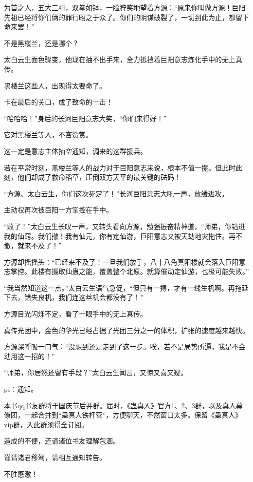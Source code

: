 \begin{this_body}
为首之人，五大三粗，双拳如钵，一脸狞笑地望着方源：“原来你叫做方源！巨阳先祖已经将你们俩的罪行昭之于众了。你们的阴谋破裂了，一切到此为止，都留下命来罢！”

不是黑楼兰，还是哪个？

太白云生面色骤变，他现在抽不出手来，全力抵挡着巨阳意志炼化手中的无上真传。

黑楼兰这些人，出现得太要命了。

卡在最后的关口，成了致命的一击！

“哈哈哈！”身后的长河巨阳意志大笑，“你们来得好！”

它对黑楼兰等人，不吝赞赏。

这一定是意志主体抽空通知，调来的这群援兵。

若在平常时刻，黑楼兰等人的战力对于巨阳意志来说，根本不值一提。但此时此刻，他们却成了救命稻草，压倒双方天平的最关键的砝码！

“方源、太白云生，你们这次死定了！”长河巨阳意志大吼一声，放缓进攻。

主动权再次被巨阳一方掌控在手中。

“败了！”太白云生长叹一声，又转头看向方源，勉强振奋精神道，“师弟，你钻进我的仙窍。我们撤！我有仙元，你有定仙游，巨阳意志又被天劫地灾拖住。再不撤，就来不及了！”

方源却摇摇头：“已经来不及了！一旦我们放手，八十八角真阳楼就会落入巨阳意志掌控。此楼有摄取仙蛊之能，覆盖整个北原。就算催动定仙游，也极可能失败。”

“我当然知道这一点。”太白云生语气急促，“但只有一搏，才有一线生机啊。再拖延下去，错失良机，我们连这丝机会都没有了！”

方源目光闪烁不定，看了一眼手中的无上真传。

真传光团中，金色的华光已经占据了光团三分之一的体积，扩张的速度越来越快。

方源深呼吸一口气：“没想到还是走到了这一步。唉，若不是局势所逼，我是不会动用这一招的！”

“师弟，你居然还留有手段？”太白云生闻言，又惊又喜又疑。

ps：通知。

本书qq书友群将于国庆节后并群。届时，《蛊真人》官方1、2、3群，以及真人幕僚团，一起合并到“蛊真人铁杆营”，方便聊天，不然窗口太多。保留《蛊真人》vip群，入此群须得全订阅。

造成的不便，还请诸位书友理解包涵。

谨请诸君移驾，请相互通知转告。

不胜感激！

\end{this_body}

